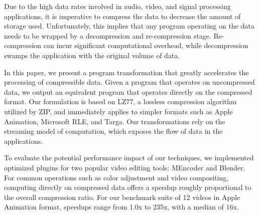 Due to the high data rates involved in audio, video, and signal
processing applications, it is imperative to compress the data to
decrease the amount of storage used.  Unfortunately, this implies that
any program operating on the data needs to be wrapped by a
decompression and re-compression stage.  Re-compression can incur
significant computational overhead, while decompression swamps the
application with the original volume of data.

In this paper, we present a program transformation that greatly
accelerates the processing of compressible data.  Given a program that
operates on uncompressed data, we output an equivalent program that
operates directly on the compressed format.  Our formulation is based
on LZ77, a lossless compression algorithm utilized by ZIP, and
immediately applies to simpler formats such as Apple Animation,
Microsoft RLE, and Targa.  Our transformations rely on the streaming
model of computation, which exposes the flow of data in the
applications.

To evaluate the potential performance impact of our techniques, we
implemented optimized plugins for two popular video editing tools:
MEncoder and Blender.  For common operations such as color adjustment
and video compositing, computing directly on compressed data offers a
speedup roughly proportional to the overall compression ratio.  For
our benchmark suite of 12 videos in Apple Animation format, speedups
range from 1.0x to 235x, with a median of 16x.
